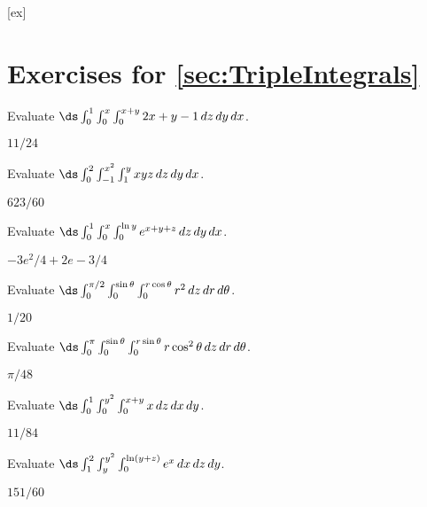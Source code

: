 [ex]
\section*{Exercises for \ref{sec:TripleIntegrals}}

\begin{enumialphparenastyle}

\begin{ex}
Evaluate $\ds\int_{0}^{1}\int_{0}^{x}\int_{0}^{x+y}
2x+y-1 \,dz\,dy\,dx$.
\begin{sol}
$11/24$
\end{sol}
\end{ex}

\begin{ex}
Evaluate $\ds\int_{0}^{2}\int_{-1}^{x^2}\int_{1}^{y}
xyz \,dz\,dy\,dx$.
\begin{sol}
$623/60$
\end{sol}
\end{ex}

\begin{ex}
Evaluate $\ds\int_{0}^{1}\int_{0}^{x}\int_{0}^{\ln y}
e^{x+y+z}\,dz\,dy\,dx$.
\begin{sol}
$-3e^2/4+2e-3/4$
\end{sol}
\end{ex}

\begin{ex}
Evaluate
$\ds\int_{0}^{\pi/2}\int_{0}^{\sin\theta}\int_{0}^{r\cos\theta}
r^2\,dz\,dr\,d\theta$.
\begin{sol}
$1/20$
\end{sol}
\end{ex}

\begin{ex}
Evaluate 
$\ds\int_{0}^{\pi}\int_{0}^{\sin\theta}\int_{0}^{r\sin\theta}
r\cos^2\theta\,dz\,dr\,d\theta$.
\begin{sol}
$\pi/48$
\end{sol}
\end{ex}

\begin{ex}
Evaluate $\ds\int_{0}^{1}\int_{0}^{y^2}\int_{0}^{x+y}
x\,dz\,dx\,dy$.
\begin{sol}
$11/84$
\end{sol}
\end{ex}

\begin{ex}
Evaluate $\ds\int_{1}^{2}\int_{y}^{y^2}\int_{0}^{\ln(y+z)}
e^x\,dx\,dz\,dy$.
\begin{sol}
$151/60$
\end{sol}
\end{ex}


\end{enumialphparenastyle}
